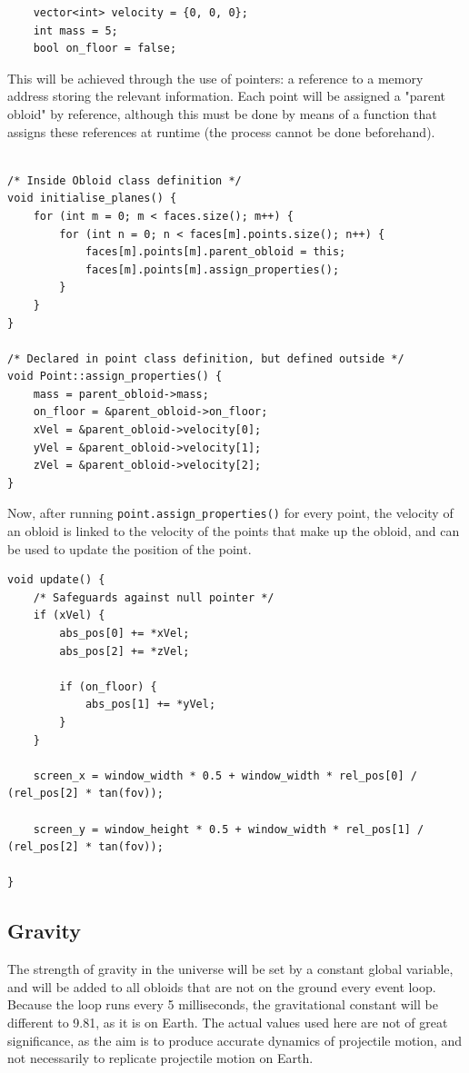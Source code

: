 \documentclass{article}
\begin{document}
\begin{lstlisting}
	vector<int> velocity = {0, 0, 0};
	int mass = 5;
	bool on_floor = false;
\end{lstlisting}
This will be achieved through the use of pointers: a reference to a memory address storing the relevant information. Each point will be assigned a "parent obloid" by reference, although this must be done by means of a function that assigns these references at runtime (the process cannot be done beforehand).

\begin{lstlisting}

/* Inside Obloid class definition */
void initialise_planes() {
	for (int m = 0; m < faces.size(); m++) {
		for (int n = 0; n < faces[m].points.size(); n++) {
			faces[m].points[m].parent_obloid = this;
			faces[m].points[m].assign_properties();
		}
	}
}

/* Declared in point class definition, but defined outside */
void Point::assign_properties() {
	mass = parent_obloid->mass;
	on_floor = &parent_obloid->on_floor;
	xVel = &parent_obloid->velocity[0];
	yVel = &parent_obloid->velocity[1];
	zVel = &parent_obloid->velocity[2];
}
\end{lstlisting}
Now, after running \verb|point.assign_properties()| for every point, the velocity of an obloid is linked to the velocity of the points that make up the obloid, and can be used to update the position of the point.
\newline
\newline
\newline
\begin{lstlisting}
void update() {
	/* Safeguards against null pointer */
	if (xVel) {
		abs_pos[0] += *xVel;
		abs_pos[2] += *zVel;

		if (on_floor) {
			abs_pos[1] += *yVel;
		}
	}

	screen_x = window_width * 0.5 + window_width * rel_pos[0] / (rel_pos[2] * tan(fov));

	screen_y = window_height * 0.5 + window_width * rel_pos[1] / (rel_pos[2] * tan(fov));	

}
\end{lstlisting}
\subsection{Gravity}
The strength of gravity in the universe will be set by a constant global variable, and will be added to all obloids that are not on the ground every event loop. Because the loop runs every 5 milliseconds, the gravitational constant will be different to 9.81, as it is on Earth. 
\newline
\newline
The actual values used here are not of great significance, as the aim is to produce accurate dynamics of projectile motion, and not necessarily to replicate projectile motion on Earth.
\end{document}
